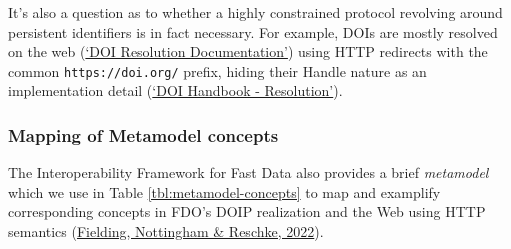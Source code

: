 It's also a question as to whether a highly constrained protocol revolving around persistent identifiers is in fact necessary. For example, DOIs are mostly resolved on the web (\protect\hyperlink{ref-1H9iQhQYq}{{`DOI Resolution Documentation'}}) using HTTP redirects with the common \texttt{https://doi.org/} prefix, hiding their Handle nature as an implementation detail (\protect\hyperlink{ref-68fzID2k}{{`DOI Handbook - Resolution'}}).

\hypertarget{mapping-of-metamodel-concepts}{%
\subsubsection{Mapping of Metamodel concepts}\label{mapping-of-metamodel-concepts}}

The Interoperability Framework for Fast Data also provides a brief \emph{metamodel} which we use in Table \ref{tbl:metamodel-concepts} to map and examplify corresponding concepts in FDO's DOIP realization and the Web using HTTP semantics (\protect\hyperlink{ref-8HJqcF1Q}{Fielding, Nottingham \& Reschke, 2022}).

